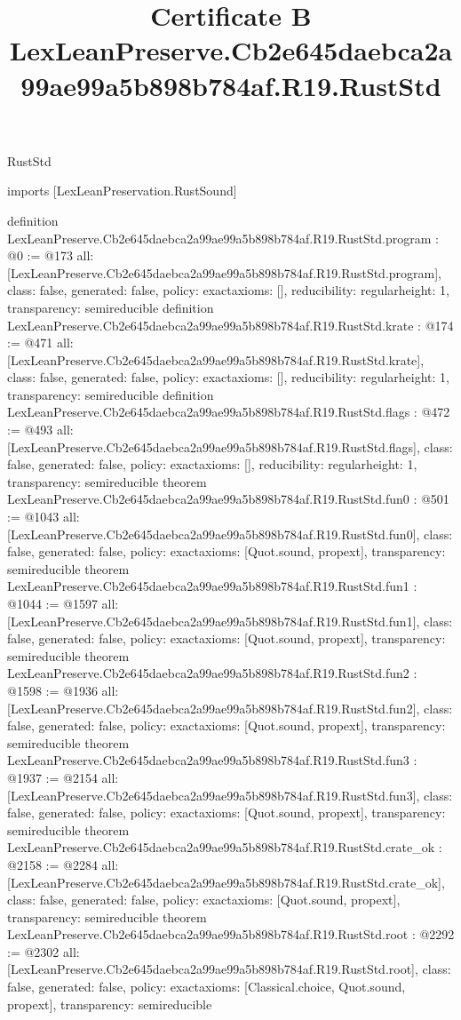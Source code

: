 \begin{lexlean}{RustStd}
\title{Certificate B LexLeanPreserve.Cb2e645daebca2a99ae99a5b898b784af.R19.RustStd}
\begin{coremodule}
imports [LexLeanPreservation.RustSound]

definition LexLeanPreserve.Cb2e645daebca2a99ae99a5b898b784af.R19.RustStd.program : @0 := @173 {
  all: [LexLeanPreserve.Cb2e645daebca2a99ae99a5b898b784af.R19.RustStd.program],
  class: false,
  generated: false,
  policy: exact{axioms: []},
  reducibility: regular{height: 1},
  transparency: semireducible
}
definition LexLeanPreserve.Cb2e645daebca2a99ae99a5b898b784af.R19.RustStd.krate : @174 := @471 {
  all: [LexLeanPreserve.Cb2e645daebca2a99ae99a5b898b784af.R19.RustStd.krate],
  class: false,
  generated: false,
  policy: exact{axioms: []},
  reducibility: regular{height: 1},
  transparency: semireducible
}
definition LexLeanPreserve.Cb2e645daebca2a99ae99a5b898b784af.R19.RustStd.flags : @472 := @493 {
  all: [LexLeanPreserve.Cb2e645daebca2a99ae99a5b898b784af.R19.RustStd.flags],
  class: false,
  generated: false,
  policy: exact{axioms: []},
  reducibility: regular{height: 1},
  transparency: semireducible
}
theorem LexLeanPreserve.Cb2e645daebca2a99ae99a5b898b784af.R19.RustStd.fun0 : @501 := @1043 {
  all: [LexLeanPreserve.Cb2e645daebca2a99ae99a5b898b784af.R19.RustStd.fun0],
  class: false,
  generated: false,
  policy: exact{axioms: [Quot.sound, propext]},
  transparency: semireducible
}
theorem LexLeanPreserve.Cb2e645daebca2a99ae99a5b898b784af.R19.RustStd.fun1 : @1044 := @1597 {
  all: [LexLeanPreserve.Cb2e645daebca2a99ae99a5b898b784af.R19.RustStd.fun1],
  class: false,
  generated: false,
  policy: exact{axioms: [Quot.sound, propext]},
  transparency: semireducible
}
theorem LexLeanPreserve.Cb2e645daebca2a99ae99a5b898b784af.R19.RustStd.fun2 : @1598 := @1936 {
  all: [LexLeanPreserve.Cb2e645daebca2a99ae99a5b898b784af.R19.RustStd.fun2],
  class: false,
  generated: false,
  policy: exact{axioms: [Quot.sound, propext]},
  transparency: semireducible
}
theorem LexLeanPreserve.Cb2e645daebca2a99ae99a5b898b784af.R19.RustStd.fun3 : @1937 := @2154 {
  all: [LexLeanPreserve.Cb2e645daebca2a99ae99a5b898b784af.R19.RustStd.fun3],
  class: false,
  generated: false,
  policy: exact{axioms: [Quot.sound, propext]},
  transparency: semireducible
}
theorem LexLeanPreserve.Cb2e645daebca2a99ae99a5b898b784af.R19.RustStd.crate_ok : @2158 := @2284 {
  all: [LexLeanPreserve.Cb2e645daebca2a99ae99a5b898b784af.R19.RustStd.crate_ok],
  class: false,
  generated: false,
  policy: exact{axioms: [Quot.sound, propext]},
  transparency: semireducible
}
theorem LexLeanPreserve.Cb2e645daebca2a99ae99a5b898b784af.R19.RustStd.root : @2292 := @2302 {
  all: [LexLeanPreserve.Cb2e645daebca2a99ae99a5b898b784af.R19.RustStd.root],
  class: false,
  generated: false,
  policy: exact{axioms: [Classical.choice, Quot.sound, propext]},
  transparency: semireducible
}


\end{coremodule}
\end{lexlean}
